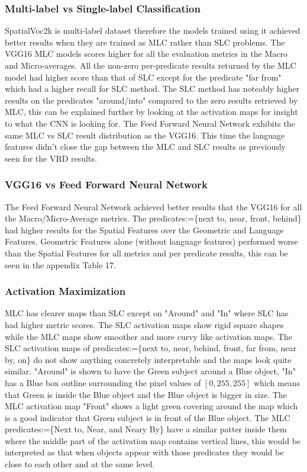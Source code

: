 \documentclass{csfyp}
\begin{document}
\subsubsection{Multi-label vs Single-label Classification}
SpatialVoc2k is multi-label dataset therefore the models trained using it achieved better results when they are trained as MLC rather than SLC problems. The VGG16 MLC models scores higher for all the evaluation metrics in the Macro and Micro-averages. All the non-zero per-predicate results returned by the MLC model had higher score than that of SLC except for the predicate "far from" which had a higher recall for SLC method. The SLC method has noteably higher results on the predicates "around/into" compared to the zero results retrieved by MLC, this can be explained further by looking at the activation maps for insight to what the CNN is looking for. The Feed Forward Neural Network exhibits the same MLC vs SLC result distribution as the VGG16. This time the language features didn't close the gap between the MLC and SLC results as previously seen for the VRD results.

\subsubsection{VGG16 vs Feed Forward Neural Network}
The Feed Forward Neural Network achieved better results that the VGG16 for all the Macro/Micro-Average metrics.
The predicates:=\{next to, near, front, behind\} had higher results for the Spatial Features over the Geometric and Language Features. Geometric Features alone (without language features) performed worse than the Spatial Features for all metrics and per predicate results, this can be seen in the appendix Table 17.

\subsubsection{Activation Maximization}
MLC has clearer maps than SLC except on "Around" and "In" where SLC has had higher metric scores. The SLC activation maps show rigid square shapes while the MLC maps show smoother and more curvy like activation maps. The SLC activation maps of predicates:=\{next to, near, behind, front, far from, near by, on\} do not show anything concretely interpretable and the maps look quite similar. "Around" is shown to have the Green subject around a Blue object, "In" has a Blue box outline surrounding the pixel values of $[0,255,255]$ which means that Green is inside the Blue object and the Blue object is bigger in size. The MLC activation map "Front" shows a light green covering around the map which is a good indicator that Green subject is in front of the Blue object. The MLC predicates:=\{Next to, Near, and Neary By\} have a similar patter inside them where the middle part of the activation map contains vertical lines, this would be interpreted as that when objects appear with those predicates they would be close to each other and at the same level.
 
\end{document}
